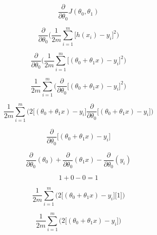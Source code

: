 \documentclass[12pt,journal]{IEEEtran}
\begin{document}
    \begin{equation}
        \frac{\partial}{\partial \theta_0} J(\theta_0, \theta_1)
    \end{equation}

    \begin{equation}
        \frac{\partial}{\partial \theta_0} \bigg( \frac{1}{2m} \sum_{i=1}^{m} \big[ h(x_i) - y_i\big] ^2  \bigg)
    \end{equation}

    \begin{equation}
        \frac{\partial}{\partial \theta_0} \bigg( \frac{1}{2m} \sum_{i=1}^{m} \Big[ (\theta_0 + \theta_1 x) - y_i \Big]^2  \bigg)
    \end{equation}

    \begin{equation}
        \frac{1}{2m} \sum_{i=1}^{m} \bigg( \frac{\partial}{\partial \theta_0} \Big[ (\theta_0 + \theta_1 x) - y_i \Big]^2  \bigg)
    \end{equation}

    \begin{equation}
        \frac{1}{2m} \sum_{i=1}^{m} \bigg( 2 \Big[ (\theta_0 + \theta_1 x) - y_i \Big] \frac{\partial}{\partial \theta_0} \Big[ (\theta_0 + \theta_1 x) - y_i \Big] \bigg)
    \end{equation}

    \begin{equation}
    \frac{\partial}{\partial \theta_0} \Big[ (\theta_0 + \theta_1 x) - y_i \Big]
    \end{equation}

    \begin{equation}
    \frac{\partial}{\partial \theta_0} ( \theta_0 ) + \frac{\partial}{\partial \theta_0} ( \theta_1 x ) - \frac{\partial}{\partial \theta_0} ( y_i )
    \end{equation}

    \begin{equation}
    1 + 0 - 0 = 1
    \end{equation}

    \begin{equation}
        \frac{1}{2m} \sum_{i=1}^{m} \bigg( 2 \Big[ (\theta_0 + \theta_1 x) - y_i \Big] \Big[ 1 \Big] \bigg)
    \end{equation}

    \begin{equation}
        \frac{1}{2m} \sum_{i=1}^{m} \bigg( 2 \Big[ (\theta_0 + \theta_1 x) - y_i \Big] \bigg)
    \end{equation}
\end{document}
